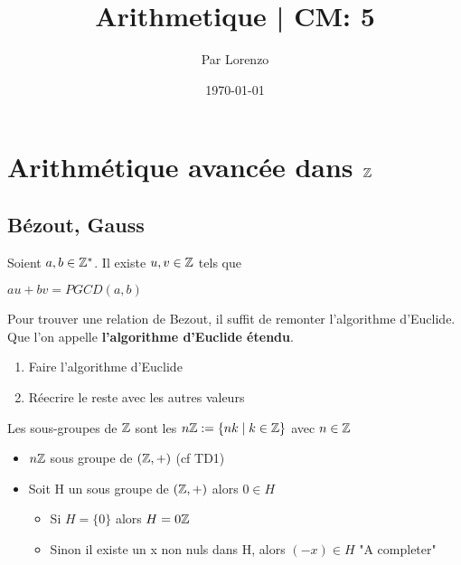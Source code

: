 \documentclass[a4paper, 12pt]{article}
\title{Arithmetique | CM: 5}
\author{Par Lorenzo}
\date{\today}
\begin{document}
\maketitle

\section{Arithmétique avancée dans $\mathbb{Z}$}

\subsection{Bézout, Gauss}

\begin{proposition}[Bézout]
    Soient $a, b \in \mathbb{Z}^*$. Il existe $u, v \in \mathbb{Z}$ tels que

    $au + bv = PGCD(a, b)$
\end{proposition}

\begin{methode}
    Pour trouver une relation de Bezout, il suffit de remonter l'algorithme d'Euclide. Que l'on
    appelle \textbf{l'algorithme d'Euclide étendu}.

    \begin{enumerate}
        \item Faire l'algorithme d'Euclide
        \item Réecrire le reste avec les autres valeurs
    \end{enumerate}
\end{methode}

\begin{lemme}
    Les sous-groupes de $\mathbb{Z}$ sont les $n\mathbb{Z} := \{nk \mid k \in \mathbb{Z}\}$ avec $n \in \mathbb{Z}$
\end{lemme}

\begin{demonstration}
    \begin{itemize}
        \item $n\mathbb{Z}$ sous groupe de $(\mathbb{Z}, +)$ (cf TD1)
        \item Soit H un sous groupe de $(\mathbb{Z}, +)$ alors $0 \in H$
        \begin{itemize}
            \item Si $H = \{0\}$ alors $H = 0\mathbb{Z}$
            \item Sinon il existe un x non nuls dans H, alors $(-x) \in H$ "A completer"
        \end{itemize}
    \end{itemize}
\end{demonstration}
\end{document}

